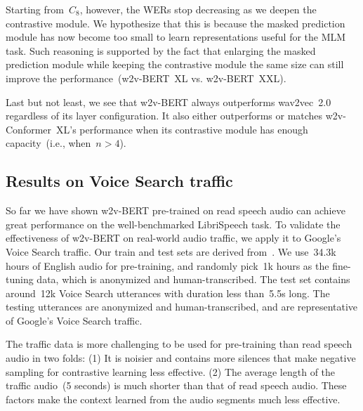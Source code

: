 \documentclass{article}
\begin{document}
Starting from~$C_{8}$, however, the WERs stop decreasing as we deepen the contrastive module.
We hypothesize that this is because the masked prediction module has now become too small to learn representations useful for the MLM task.
Such reasoning is supported by the fact that enlarging the masked prediction module while keeping the contrastive module the same size can still improve the performance~(w2v-BERT~XL vs. w2v-BERT~XXL).

Last but not least, we see that w2v-BERT always outperforms wav2vec~2.0 regardless of its layer configuration.
It also either outperforms or matches w2v-Conformer~XL's performance when its contrastive module has enough capacity~(i.e., when~$n > 4$).





\subsection{Results on Voice Search traffic}







So far we have shown w2v-BERT pre-trained on read speech audio can achieve great performance on the well-benchmarked LibriSpeech task.
To validate the effectiveness of w2v-BERT on real-world audio traffic, we apply it to Google's Voice Search traffic.
Our train and test sets are derived from~\cite{li2021scaling}.
We use~34.3k hours of English audio for pre-training, and randomly pick~1k hours as the fine-tuning data, which is anonymized and human-transcribed.
The test set contains around~12k Voice Search utterances with duration less than~5.5s long.
The testing utterances are anonymized and human-transcribed, and are representative of Google’s Voice Search traffic.

The traffic data is more challenging to be used for pre-training than read speech audio in two folds: (1) It is noisier and contains more silences that make negative sampling for contrastive learning less effective.
(2) The average length of the traffic audio~(5 seconds) is much shorter than that of read speech audio.
These factors make the context learned from the audio segments much less effective.
\end{document}

